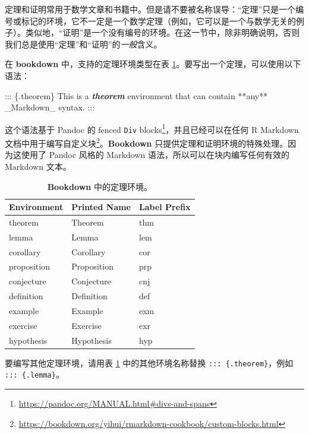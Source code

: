\documentclass[
  12pt,
]{krantz}
\newenvironment{Shaded}{\begin{snugshade}}{\end{snugshade}}
\newcommand{\InformationTok}[1]{\textcolor[rgb]{0.56,0.35,0.01}{\textbf{\textit{#1}}}}
\newcommand{\NormalTok}[1]{#1}
\renewcommand{\href}[2]{#2\footnote{\url{#1}}}
\theoremstyle{definition}
\theoremstyle{definition}
\theoremstyle{definition}
\theoremstyle{definition}
\theoremstyle{remark}
\begin{document}
定理和证明常用于数学文章和书籍中。但是请不要被名称误导：``定理''只是一个编号或标记的环境，它不一定是一个数学定理（例如，它可以是一个与数学无关的例子）。类似地，``证明''是一个没有编号的环境。在这一节中，除非明确说明，否则我们总是使用``定理''和``证明''的\emph{一般}含义。

在 \textbf{bookdown} 中，支持的定理环境类型在表 \ref{tab:theorem-envs}。要写出一个定理，可以使用以下语法：

\begin{Shaded}
\begin{Highlighting}[]
\NormalTok{::: \{.theorem\}}
\NormalTok{This is a }\InformationTok{\textasciigrave{}theorem\textasciigrave{}}\NormalTok{ environment that can contain **any**}
\NormalTok{\_Markdown\_ syntax.}
\NormalTok{:::}
\end{Highlighting}
\end{Shaded}

这个语法基于 Pandoc 的 \href{https://pandoc.org/MANUAL.html\#divs-and-spans}{fenced \texttt{Div} blocks}，并且已经可以在任何 R Markdown 文档中用于编写\href{https://bookdown.org/yihui/rmarkdown-cookbook/custom-blocks.html}{自定义块}。\textbf{Bookdown} 只提供定理和证明环境的特殊处理。因为这使用了 Pandoc 风格的 Markdown 语法，所以可以在块内编写任何有效的 Markdown 文本。



\begin{table}

\caption{\label{tab:theorem-envs}\textbf{Bookdown} 中的定理环境。}
\centering
\begin{tabular}[t]{lll}
\toprule
Environment & Printed Name & Label Prefix\\
\midrule
theorem & Theorem & thm\\
lemma & Lemma & lem\\
corollary & Corollary & cor\\
proposition & Proposition & prp\\
conjecture & Conjecture & cnj\\
\addlinespace
definition & Definition & def\\
example & Example & exm\\
exercise & Exercise & exr\\
hypothesis & Hypothesis & hyp\\
\bottomrule
\end{tabular}
\end{table}

要编写其他定理环境，请用表 \ref{tab:theorem-envs} 中的其他环境名称替换 \texttt{:::\ \{.theorem\}}，例如 \texttt{:::\ \{.lemma\}}。
\end{document}
